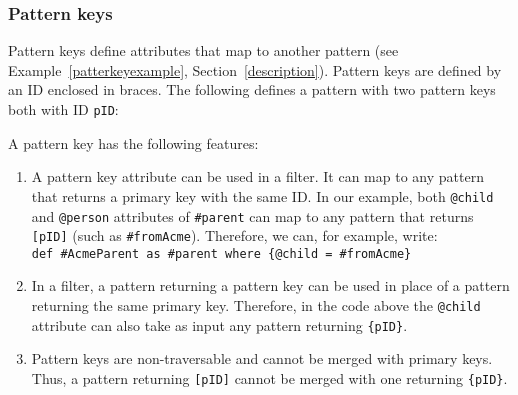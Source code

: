 	
	
	\subsubsection{Pattern keys} 
	\label{patternkeys}
	
	Pattern keys define attributes that map to another pattern (see Example~\ref{patterkeyexample}, Section~\ref{description}).
		Pattern keys are defined by %
	an ID enclosed in  braces. %
	The following %
	defines a pattern with two pattern keys both with ID \texttt{pID}:\\%
	
	A pattern key has the following features: %
\begin{enumerate}
	\item A pattern key attribute can be used in a filter. It can map to any pattern that returns a primary key with the same ID. In our example, both \texttt{@child} and \texttt{@person} attributes of \texttt{\#parent} can map to any pattern that returns \texttt{[pID]} (such as \texttt{\#fromAcme}). Therefore, we can, for example, write: \\
	{\small \colorbox{Light}{\texttt{def \#AcmeParent as \#parent where \{@child = \#fromAcme\}}}}
	\item In a filter, a pattern returning a pattern key can be used in place of a pattern returning the same primary key. Therefore, in the code above the \texttt{@child} attribute can also take as input any pattern returning \texttt{\{pID\}}.
	\item Pattern keys are non-traversable and cannot be merged with primary keys. Thus, a pattern returning \texttt{[pID]} cannot be merged with one returning \texttt{\{pID\}}. %

\end{enumerate}

